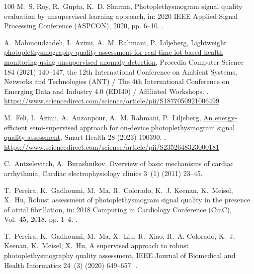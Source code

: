 \documentclass[final,3p,times,twocolumn]{elsarticle}
\begin{document}
\begin{thebibliography}{100}
M.~S. Roy, R.~Gupta, K.~D. Sharma, Photoplethysmogram signal quality evaluation
  by unsupervised learning approach, in: 2020 IEEE Applied Signal Processing
  Conference (ASPCON), 2020, pp. 6--10.
\newblock \href {https://doi.org/10.1109/ASPCON49795.2020.9276733}
  {}.

A.~Mahmoudzadeh, I.~Azimi, A.~M. Rahmani, P.~Liljeberg,
  \href{https://www.sciencedirect.com/science/article/pii/S1877050921006499}{Lightweight
  photoplethysmography quality assessment for real-time iot-based health
  monitoring using unsupervised anomaly detection}, Procedia Computer Science
  184 (2021) 140--147, the 12th International Conference on Ambient Systems,
  Networks and Technologies (ANT) / The 4th International Conference on
  Emerging Data and Industry 4.0 (EDI40) / Affiliated Workshops.
\newblock \href {https://doi.org/https://doi.org/10.1016/j.procs.2021.03.025}
  {}.
\newline\urlprefix\url{https://www.sciencedirect.com/science/article/pii/S1877050921006499}

M.~Feli, I.~Azimi, A.~Anzanpour, A.~M. Rahmani, P.~Liljeberg,
  \href{https://www.sciencedirect.com/science/article/pii/S2352648323000181}{An
  energy-efficient semi-supervised approach for on-device photoplethysmogram
  signal quality assessment}, Smart Health 28 (2023) 100390.
\newblock \href {https://doi.org/https://doi.org/10.1016/j.smhl.2023.100390}
  {}.
\newline\urlprefix\url{https://www.sciencedirect.com/science/article/pii/S2352648323000181}

C.~Antzelevitch, A.~Burashnikov, Overview of basic mechanisms of cardiac
  arrhythmia, Cardiac electrophysiology clinics 3~(1) (2011) 23--45.

T.~Pereira, K.~Gadhoumi, M.~Ma, R.~Colorado, K.~J. Keenan, K.~Meisel, X.~Hu,
  Robust assessment of photoplethysmogram signal quality in the presence of
  atrial fibrillation, in: 2018 Computing in Cardiology Conference (CinC),
  Vol.~45, 2018, pp. 1--4.
\newblock \href {https://doi.org/10.22489/CinC.2018.254}
  {}.

T.~Pereira, K.~Gadhoumi, M.~Ma, X.~Liu, R.~Xiao, R.~A. Colorado, K.~J. Keenan,
  K.~Meisel, X.~Hu, A supervised approach to robust photoplethysmography
  quality assessment, IEEE Journal of Biomedical and Health Informatics 24~(3)
  (2020) 649--657.
\newblock \href {https://doi.org/10.1109/JBHI.2019.2909065}
  {}.


\end{thebibliography}
\end{document}
